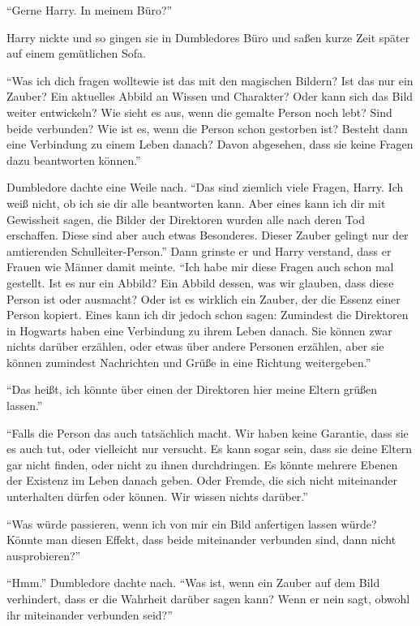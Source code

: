\enquote{Gerne Harry. In meinem Büro?}

Harry nickte und so gingen sie in Dumbledores Büro und saßen kurze Zeit später auf einem gemütlichen Sofa.

\enquote{Was ich dich fragen wollte\abs wie ist das mit den magischen Bildern? Ist das nur ein Zauber? Ein aktuelles Abbild an Wissen und Charakter? Oder kann sich das Bild weiter entwickeln? Wie sieht es aus, wenn die gemalte Person noch lebt? Sind beide verbunden? Wie ist es, wenn die Person schon gestorben ist? Besteht dann eine Verbindung zu einem Leben danach? Davon abgesehen, dass sie keine Fragen dazu beantworten können.}

Dumbledore dachte eine Weile nach. \enquote{Das sind ziemlich viele Fragen, Harry. Ich weiß nicht, ob ich sie dir alle beantworten kann. Aber eines kann ich dir mit Gewissheit sagen, die Bilder der Direktoren wurden alle nach deren Tod erschaffen. Diese sind aber auch etwas Besonderes. Dieser Zauber gelingt nur der amtierenden Schulleiter-Person.} Dann grinste er und Harry verstand, dass er Frauen wie Männer damit meinte. \enquote{Ich habe mir diese Fragen auch schon mal gestellt. Ist es nur ein Abbild? Ein Abbild dessen, was wir glauben, dass diese Person ist oder ausmacht? Oder ist es wirklich ein Zauber, der die Essenz einer Person kopiert. \gst Eines kann ich dir jedoch schon sagen: Zumindest die Direktoren in Hogwarts haben eine Verbindung zu ihrem Leben danach. Sie können zwar nichts darüber erzählen, oder etwas über andere Personen erzählen, aber sie können zumindest Nachrichten und Grüße in eine Richtung weitergeben.}

\enquote{Das heißt, ich könnte über einen der Direktoren hier meine Eltern grüßen lassen.}

\enquote{Falls die Person das auch tatsächlich macht. Wir haben keine Garantie, dass sie es auch tut, oder vielleicht nur versucht. Es kann sogar sein, dass sie deine Eltern gar nicht finden, oder nicht zu ihnen durchdringen. Es könnte mehrere Ebenen der Existenz im Leben danach geben. Oder Fremde, die sich nicht miteinander unterhalten dürfen oder können. Wir wissen nichts darüber.}

\enquote{Was würde passieren, wenn ich von mir ein Bild anfertigen lassen würde? Könnte man diesen Effekt, dass beide miteinander verbunden sind, dann nicht ausprobieren?}

\enquote{Hmm.} Dumbledore dachte nach. \enquote{Was ist, wenn ein Zauber auf dem Bild verhindert, dass er die Wahrheit darüber sagen kann? Wenn er nein sagt, obwohl ihr miteinander verbunden seid?}

